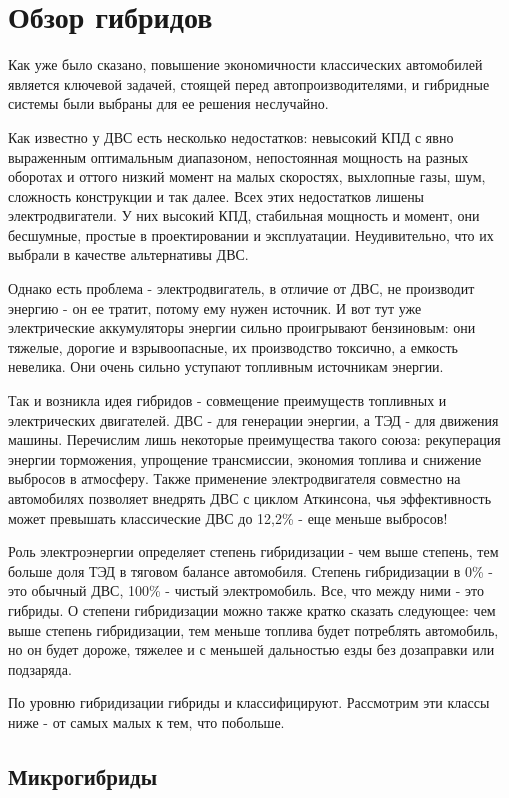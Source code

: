 \chapter{Обзор гибридов}

Как уже было сказано, повышение экономичности классических автомобилей является ключевой задачей, стоящей перед автопроизводителями, и гибридные системы были выбраны для ее решения неслучайно.

Как известно у ДВС есть несколько недостатков: невысокий КПД с явно выраженным оптимальным диапазоном, непостоянная мощность на разных оборотах и оттого низкий момент на малых скоростях, выхлопные газы, шум, сложность конструкции и так далее. Всех этих недостатков лишены электродвигатели. У них высокий КПД, стабильная мощность и момент, они бесшумные, простые в проектировании и эксплуатации. Неудивительно, что их выбрали в качестве альтернативы ДВС.

Однако есть проблема - электродвигатель, в отличие от ДВС, не производит энергию - он ее тратит, потому ему нужен источник. И вот тут уже электрические аккумуляторы энергии сильно проигрывают бензиновым: они тяжелые, дорогие и взрывоопасные, их производство токсично, а емкость невелика. Они очень сильно уступают топливным источникам энергии.

Так и возникла идея гибридов - совмещение преимуществ топливных и электрических двигателей. ДВС - для генерации энергии, а ТЭД - для движения машины. Перечислим лишь некоторые преимущества такого союза: рекуперация энергии торможения, упрощение трансмиссии, экономия топлива и снижение выбросов в атмосферу. Также применение электродвигателя совместно на автомобилях позволяет внедрять ДВС с циклом Аткинсона, чья эффективность может превышать классические ДВС до 12,2\% \cite{Смирнов} - еще меньше выбросов!

Роль электроэнергии определяет степень гибридизации - чем выше степень, тем больше доля ТЭД в тяговом балансе автомобиля. Степень гибридизации в 0\% - это обычный ДВС, 100\% - чистый электромобиль. Все, что между ними - это гибриды. О степени гибридизации можно также кратко сказать следующее: чем выше степень гибридизации, тем меньше топлива будет потреблять автомобиль, но он будет дороже, тяжелее и с меньшей дальностью езды без дозаправки или подзаряда.

По уровню гибридизации гибриды и классифицируют. Рассмотрим эти классы ниже - от самых малых к тем, что побольше.

\newpage


\section{Микрогибриды}

